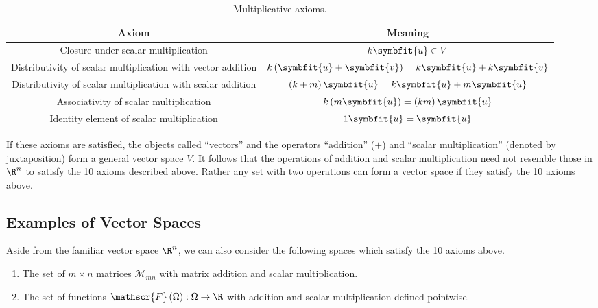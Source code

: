 \documentclass{article}
\begin{document}
\begin{table}[H]
    \centering
    \begin{tabular}{c c}
        \toprule
        \textbf{Axiom}                                               & \textbf{Meaning}                                                             \\
        \midrule
        Closure under scalar multiplication                          & \(k \symbfit{u} \in V\)                                                      \\
        Distributivity of scalar multiplication with vector addition & \(k \left( \symbfit{u} + \symbfit{v} \right) = k\symbfit{u} + k\symbfit{v}\) \\
        Distributivity of scalar multiplication with scalar addition & \(\left( k + m \right) \symbfit{u} = k\symbfit{u} + m\symbfit{u}\)           \\
        Associativity of scalar multiplication                       & \(k \left( m\symbfit{u} \right) = \left( k m \right) \symbfit{u}\)           \\
        Identity element of scalar multiplication                    & \(1 \symbfit{u} = \symbfit{u}\)                                              \\
        \bottomrule
    \end{tabular}
    \caption{Multiplicative axioms.} %
\end{table}
If these axioms are satisfied, the objects called ``vectors'' and the operators ``addition'' (\(+\)) and ``scalar multiplication'' (denoted by juxtaposition) form a general vector space \(V\).
It follows that the operations of addition and scalar multiplication need not resemble those in \(\R^n\) to satisfy the 10 axioms described above.
Rather any set with two operations can form a vector space if they satisfy the 10 axioms above.
\subsection{Examples of Vector Spaces}
Aside from the familiar vector space \(\R^n\), we can also consider the following spaces which satisfy the 10 axioms above.
\begin{enumerate}
    \item The set of \(m \times n\) matrices \(\mathscr{M}_{mn}\) with matrix addition and scalar multiplication.
    \item The set of functions \(\mathscr{F}\left( \Omega \right) : \Omega \to \R\) with addition and scalar multiplication defined pointwise.
\end{enumerate}
\end{document}
